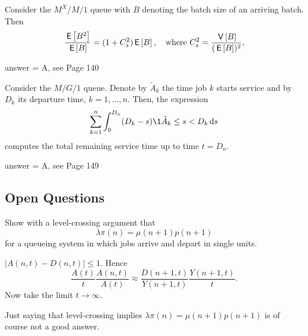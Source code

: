 \begin{exercise}[201903]
  Consider the $M^X/M/1$ queue with $B$ denoting the batch size of an arriving batch. Then
\begin{equation*}
  \frac{\,\mathsf{E}\left[B^2\right]}{\,\mathsf{E}\left[B\right]} = (1+C_s^2)\,\mathsf{E}\left[B\right], \quad\text{where }
C_s^2 = \frac{\,\mathsf{V}\left[B\right]}{(\,\mathsf{E}\left[B\right])^2},
\end{equation*}

\begin{solution}
answer = A, see Page 140
\end{solution}
\end{exercise}

\begin{exercise}[201903]
Consider the $M/G/1$ queue. Denote by $\tilde{A}_k$ the time job $k$ starts service and by $D_k$ its departure time, $k=1,\ldots,n$. Then, the expression
\begin{equation*}
\sum_{k=1}^{n} \int_0^{D_n} (D_k-s)\1{\tilde A_k \leq s < D_k} \d s
\end{equation*}
computes the total remaining service time up to time $t = D_n$.
\begin{solution}
answer = A, see Page 149
\end{solution}
\end{exercise}



\subsection{Open Questions}

\begin{exercise}[201704]{2} Show with a level-crossing argument that
  \begin{equation}\label{eq:90}
  \lambda \pi(n) = \mu(n+1) p(n+1)
  \end{equation}
  for a queueing system in which jobs arrive and depart in single
  units.
\begin{solution}
    $|A(n,t)-D(n,t)| \leq 1$. Hence
    \begin{equation*}
      \frac{A(t)}{t} \frac{A(n,t)}{A(t)} \approx 
      \frac{D(n+1, t)}{Y(n+1,t)} \frac{Y(n+1,t)}{t}.
    \end{equation*}
Now take the limit $t\to \infty$.

Just saying that level-crossing implies $\lambda \pi(n) = \mu(n+1)p(n+1)$ is of course not a good answer. 
\end{solution}
\end{exercise}

